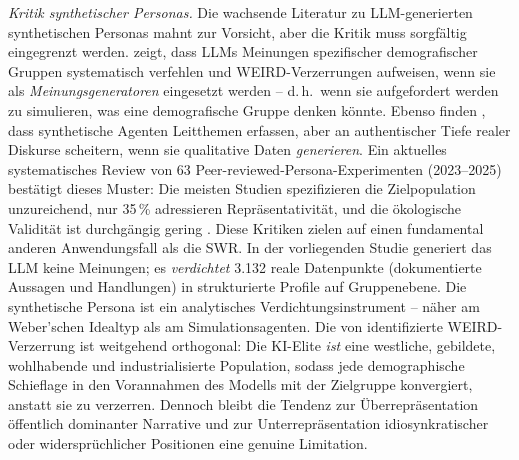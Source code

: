 \documentclass[12pt,a4paper]{article}
\begin{document}
\emph{Kritik synthetischer Personas.} Die wachsende Literatur zu LLM-generierten synthetischen Personas mahnt zur Vorsicht, aber die Kritik muss sorgf\"altig eingegrenzt werden. \citet{Santurkar2023} zeigt, dass LLMs Meinungen spezifischer demografischer Gruppen systematisch verfehlen und \glqq WEIRD\grqq-Verzerrungen aufweisen, wenn sie als \emph{Meinungsgeneratoren} eingesetzt werden -- d.\,h.\ wenn sie aufgefordert werden zu simulieren, was eine demografische Gruppe denken k\"onnte. Ebenso finden \citet{Argyle2023}, dass synthetische Agenten Leitthemen erfassen, aber an authentischer Tiefe realer Diskurse scheitern, wenn sie qualitative Daten \emph{generieren}. Ein aktuelles systematisches Review von 63 Peer-reviewed-Persona-Experimenten (2023--2025) best\"atigt dieses Muster: Die meisten Studien spezifizieren die Zielpopulation unzureichend, nur 35\,\% adressieren Repr\"asentativit\"at, und die \"okologische Validit\"at ist durchg\"angig gering \citep{Batzner2025WhosePersonae}. Diese Kritiken zielen auf einen fundamental anderen Anwendungsfall als die SWR. In der vorliegenden Studie generiert das LLM keine Meinungen; es \emph{verdichtet} 3.132 reale Datenpunkte (dokumentierte Aussagen und Handlungen) in strukturierte Profile auf Gruppenebene. Die synthetische Persona ist ein analytisches Verdichtungsinstrument -- n\"aher am Weber'schen Idealtyp als am Simulationsagenten. Die von \citeauthor{Santurkar2023} identifizierte WEIRD-Verzerrung ist weitgehend orthogonal: Die KI-Elite \emph{ist} eine westliche, gebildete, wohlhabende und industrialisierte Population, sodass jede demographische Schieflage in den Vorannahmen des Modells mit der Zielgruppe konvergiert, anstatt sie zu verzerren. Dennoch bleibt die Tendenz zur \"Uberrepr\"asentation \"offentlich dominanter Narrative und zur Unterrepr\"asentation idiosynkratischer oder widerspr\"uchlicher Positionen eine genuine Limitation.
\end{document}
